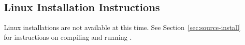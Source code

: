 \subsection{Linux Installation Instructions}
\label{sec:linux-install}

Linux installations are not available at this time.  See Section~\ref{sec:source-install} for instructions
on compiling and running \map{}.

